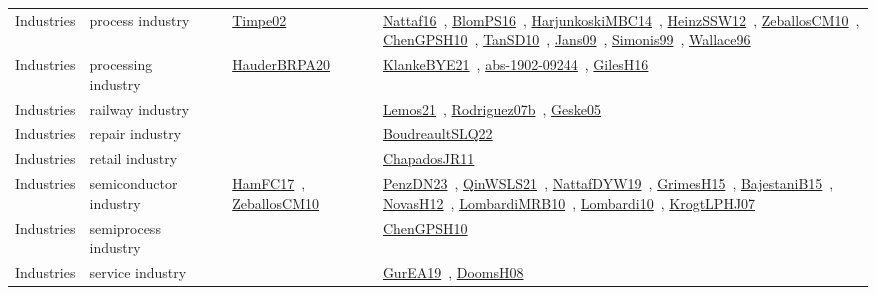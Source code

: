 {\begin{longtable}{lp{3cm}>{\raggedright\arraybackslash}p{6cm}>{\raggedright\arraybackslash}p{6cm}>{\raggedright\arraybackslash}p{8cm}}
Industries & process industry &  & \href{../works/Timpe02.pdf}{Timpe02}~\cite{Timpe02} & \href{../works/Nattaf16.pdf}{Nattaf16}~\cite{Nattaf16}, \href{../works/BlomPS16.pdf}{BlomPS16}~\cite{BlomPS16}, \href{../works/HarjunkoskiMBC14.pdf}{HarjunkoskiMBC14}~\cite{HarjunkoskiMBC14}, \href{../works/HeinzSSW12.pdf}{HeinzSSW12}~\cite{HeinzSSW12}, \href{../works/ZeballosCM10.pdf}{ZeballosCM10}~\cite{ZeballosCM10}, \href{../works/ChenGPSH10.pdf}{ChenGPSH10}~\cite{ChenGPSH10}, \href{../works/TanSD10.pdf}{TanSD10}~\cite{TanSD10}, \href{../works/Jans09.pdf}{Jans09}~\cite{Jans09}, \href{../works/Simonis99.pdf}{Simonis99}~\cite{Simonis99}, \href{../works/Wallace96.pdf}{Wallace96}~\cite{Wallace96}\\
Industries & processing industry &  & \href{../works/HauderBRPA20.pdf}{HauderBRPA20}~\cite{HauderBRPA20} & \href{../works/KlankeBYE21.pdf}{KlankeBYE21}~\cite{KlankeBYE21}, \href{../works/abs-1902-09244.pdf}{abs-1902-09244}~\cite{abs-1902-09244}, \href{../works/GilesH16.pdf}{GilesH16}~\cite{GilesH16}\\
Industries & railway industry &  &  & \href{../works/Lemos21.pdf}{Lemos21}~\cite{Lemos21}, \href{../works/Rodriguez07b.pdf}{Rodriguez07b}~\cite{Rodriguez07b}, \href{../works/Geske05.pdf}{Geske05}~\cite{Geske05}\\
Industries & repair industry &  &  & \href{../works/BoudreaultSLQ22.pdf}{BoudreaultSLQ22}~\cite{BoudreaultSLQ22}\\
Industries & retail industry &  &  & \href{../works/ChapadosJR11.pdf}{ChapadosJR11}~\cite{ChapadosJR11}\\
Industries & semiconductor industry &  & \href{../works/HamFC17.pdf}{HamFC17}~\cite{HamFC17}, \href{../works/ZeballosCM10.pdf}{ZeballosCM10}~\cite{ZeballosCM10} & \href{../works/PenzDN23.pdf}{PenzDN23}~\cite{PenzDN23}, \href{../works/QinWSLS21.pdf}{QinWSLS21}~\cite{QinWSLS21}, \href{../works/NattafDYW19.pdf}{NattafDYW19}~\cite{NattafDYW19}, \href{../works/GrimesH15.pdf}{GrimesH15}~\cite{GrimesH15}, \href{../works/BajestaniB15.pdf}{BajestaniB15}~\cite{BajestaniB15}, \href{../works/NovasH12.pdf}{NovasH12}~\cite{NovasH12}, \href{../works/LombardiMRB10.pdf}{LombardiMRB10}~\cite{LombardiMRB10}, \href{../works/Lombardi10.pdf}{Lombardi10}~\cite{Lombardi10}, \href{../works/KrogtLPHJ07.pdf}{KrogtLPHJ07}~\cite{KrogtLPHJ07}\\
Industries & semiprocess industry &  &  & \href{../works/ChenGPSH10.pdf}{ChenGPSH10}~\cite{ChenGPSH10}\\
Industries & service industry &  &  & \href{../works/GurEA19.pdf}{GurEA19}~\cite{GurEA19}, \href{../works/DoomsH08.pdf}{DoomsH08}~\cite{DoomsH08}\\

\end{longtable}}
